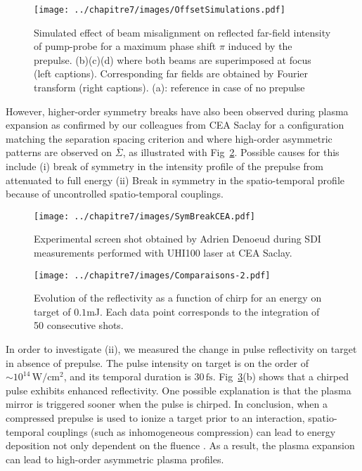 \begin{figure}[H]
\centering
\texttt{[image: ../chapitre7/images/OffsetSimulations.pdf]}\\
\caption{\label{fig:OffsetSimulations}Simulated effect of beam misalignment on reflected far-field intensity of pump-probe for a maximum phase shift $\pi$ induced by the prepulse. (b)(c)(d) where both beams are superimposed at focus (left captions). Corresponding far fields are obtained by Fourier transform (right captions). (a): reference in case of no prepulse }
\end{figure}

\noindent However, higher-order symmetry breaks have also been observed during plasma expansion as confirmed by our colleagues from CEA Saclay for a configuration matching the separation spacing criterion and where high-order asymmetric patterns
are observed on $\bar{\Sigma}$, as illustrated with Fig~\ref{fig:SymBreakCEA}.  Possible causes for this include (i) break of symmetry in the intensity profile of the prepulse from attenuated to full energy (ii) Break in symmetry in the spatio-temporal profile because of uncontrolled spatio-temporal couplings. 


\begin{figure}[H]
\centering
\texttt{[image: ../chapitre7/images/SymBreakCEA.pdf]}\\
\caption{\label{fig:SymBreakCEA} Experimental screen shot obtained by Adrien Denoeud during SDI measurements performed with UHI100 laser at CEA Saclay.}
\end{figure}


\begin{figure}[H]
\centering
\texttt{[image: ../chapitre7/images/Comparaisons-2.pdf]}\\
\caption{\label{fig:Comparaisons} Evolution of the reflectivity as a function of chirp for an energy on target of $0.1$mJ. Each data point corresponds to the integration of 50 consecutive shots.}
\end{figure}

\noindent In order to investigate (ii), we measured the change in pulse reflectivity on target  in absence of prepulse. The pulse intensity on target is on the order of $\sim 10^{14}\,\mathrm{W/cm^2}$, and its temporal duration is $30\,\mathrm{fs}$.   Fig~\ref{fig:Comparaisons}(b) shows that a chirped pulse exhibits enhanced reflectivity. One possible explanation is that the plasma mirror is triggered sooner when the pulse is chirped. In conclusion, when a compressed prepulse is used to ionize a target prior to an interaction, spatio-temporal couplings (such as inhomogeneous compression) can lead to energy deposition not only dependent on the fluence . As a result, the plasma expansion can lead to high-order asymmetric plasma profiles.





